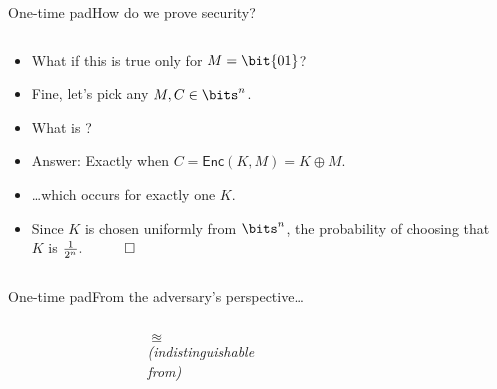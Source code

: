 \documentclass[aspectratio=169, lualatex, handout]{beamer}
\begin{document}
\begin{frame}{One-time pad}{How do we prove security?}
	\begin{columns}[c]
		\begin{column}{0.7\textwidth}
			\begin{itemize}[<+->]
				\item What if this is true only for $M = \bit{01}$?
				\item Fine, let's pick any $M, C \in \bits^n$.
				\item What is ?
				\item Answer: Exactly when $C = \textsf{Enc}(K, M) = K \oplus M$.
				\item \ldots which occurs for exactly one $K$.
				\item Since $K$ is chosen uniformly from $\bits^n$, the probability of choosing that $K$ is $\frac{1}{2^n}. \quad \qed$
			\end{itemize}
		\end{column}
		\begin{column}{0.3\textwidth}
		\end{column}
	\end{columns}
\end{frame}

\begin{frame}{One-time pad}{From the adversary's perspective\ldots}
	\begin{columns}[c]
		\begin{column}{0.35\textwidth}
		\end{column}
		\begin{column}{0.3\textwidth}
			\begin{center}
				{\huge{$\approxeq$}} \\[1em]
				{\scriptsize\textit{(indistinguishable \\ from)}}
			\end{center}
		\end{column}
		\begin{column}{0.35\textwidth}
		\end{column}
	\end{columns}
\end{frame}
\end{document}
